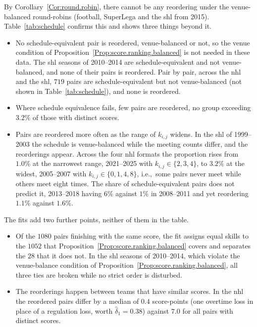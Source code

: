 \documentclass[letterpaper,12pt]{article}
\newcommand{\ie}{i.e.,~} 		%
\newcommand{\set}[1]{\{#1\}}
\begin{document}
By Corollary~\ref{Cor:round.robin}, there cannot be any reordering under the
venue-balanced round-robins (football, SuperLega and the \gls{shl} from 2015).
Table~\ref{tab:schedule} confirms this and shows three things beyond it.

\begin{itemize}
\item No schedule-equivalent pair is reordered, venue-balanced or not, so the venue
condition of Proposition~\ref{Prop:score.ranking.balanced} is not needed in these data.
The \gls{shl} seasons of 2010--2014 are schedule-equivalent and not venue-balanced, and
none of their pairs is reordered. Pair by pair, across the \gls{nhl} and the \gls{shl},
$719$ pairs are schedule-equivalent but not venue-balanced (not shown in
Table~\ref{tab:schedule}), and none is reordered.

\item Where schedule equivalence fails, few pairs are reordered, no group exceeding
$3.2\%$ of those with distinct scores.

\item Pairs are reordered more often as the range of $k_{i,j}$ widens. In the \gls{shl} of
1999--2003 the schedule is venue-balanced while the meeting counts differ, and the
reorderings appear. Across the four \gls{nhl} formats the proportion rises from
$1.0\%$ at the narrowest range, 2021--2025 with $k_{i,j}\in\set{2,3,4}$, to $3.2\%$ at the
widest, 2005--2007 with $k_{i,j}\in\set{0,1,4,8}$, \ie some pairs never meet while others
meet eight times. The share of schedule-equivalent pairs does not predict it, 2013--2018
having $6\%$ against $1\%$ in 2008--2011 and yet reordering $1.1\%$ against $1.6\%$.

\end{itemize}


The fits add two further points, neither of them in the table.
\begin{itemize}
\item Of the $1080$ pairs finishing with the same score, the fit assigns equal skills to
the $1052$ that Proposition~\ref{Prop:score.ranking.balanced} covers and separates the $28$
that it does not. In the \gls{shl} seasons of 2010--2014, which violate the venue-balance condition of
Proposition~\ref{Prop:score.ranking.balanced}, all three ties are broken while no strict
order is disturbed.

\item The reorderings happen between teams that have similar scores. In the \gls{nhl}
the reordered pairs differ by a median of $0.4$ score-points (one overtime loss in place of a
regulation loss, worth $\hat\delta_1=0.38$) against $7.0$ for all pairs with distinct scores.
\end{itemize}
\end{document}
